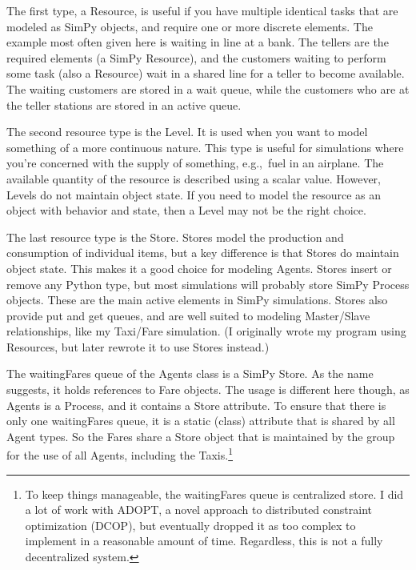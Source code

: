 \documentclass[11pt,letterpaper,onecolumn,twoside,openright,final]{report}
\begin{document}
The first type, a Resource, is useful if you have multiple identical tasks that are modeled as SimPy objects, and require one or more discrete elements.
The example most often given here is waiting in line at a bank.
The tellers are the required elements (a SimPy Resource), and the customers waiting to perform some task (also a Resource) wait in a shared line for a teller to become available.
The waiting customers are stored in a wait queue, while the customers who are at the teller stations are stored in an active queue.

The second resource type is the Level.
It is used when you want to model something of a more continuous nature.
This type is useful for simulations where you're concerned with the supply of something, e.g.,~fuel in an airplane.
The available quantity of the resource is described using a scalar value.
However, Levels do not maintain object state.
If you need to model the resource as an object with behavior and state, then a Level may not be the right choice.

The last resource type is the Store.
Stores model the production and consumption of individual items, but a key difference is that Stores do maintain object state.
This makes it a good choice for modeling Agents.
Stores insert or remove any Python type, but most simulations will probably store SimPy Process objects.
These are the main active elements in SimPy simulations.
Stores also provide put and get queues, and are well suited to modeling Master/Slave relationships, like my Taxi/Fare simulation.
(I originally wrote my program using Resources, but later rewrote it to use Stores instead.)

The waitingFares queue of the Agents class is a SimPy Store.
As the name suggests, it holds references to Fare objects.
The usage is different here though, as Agents is a Process, and it contains a Store attribute.
To ensure that there is only one waitingFares queue, it is a static (class) attribute that is shared by all Agent types.
So the Fares share a Store object that is maintained by the group for the use of all Agents, including the Taxis.\footnote{To keep things manageable, the waitingFares queue is centralized store.
I did a lot of work with ADOPT, a novel approach to distributed constraint optimization (DCOP), but eventually dropped it as too complex to implement in a reasonable amount of time.
Regardless, this is not a fully decentralized system.}
\end{document}
